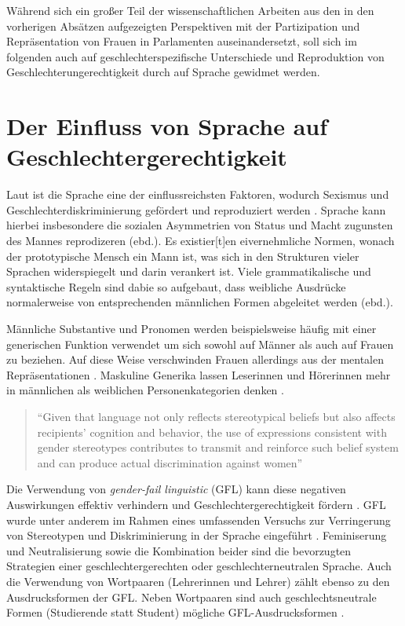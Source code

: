 \documentclass[12pt, 
    twoside=false, 
    bibliography=totoc, 
    numbers=endperiod, 
    headings=normal, 
    toc=chapterentrydotfill
    ]{scrbook}
\begin{document}
Während sich ein großer Teil der wissenschaftlichen Arbeiten aus den in den vorherigen Absätzen aufgezeigten Perspektiven mit der Partizipation und Repräsentation von Frauen in Parlamenten auseinandersetzt, soll sich im folgenden auch auf geschlechterspezifische Unterschiede und Reproduktion von Geschlechterungerechtigkeit durch auf Sprache gewidmet werden.

\chapter{Der Einfluss von Sprache auf Geschlechtergerechtigkeit}

Laut \textcite{menegatti_2017} ist die Sprache eine der einflussreichsten Faktoren, wodurch Sexismus und Geschlechterdiskriminierung gefördert und reproduziert werden \parencite*[1]{menegatti_2017}. Sprache kann hierbei insbesondere die sozialen Asymmetrien von Status und Macht zugunsten des Mannes reprodizeren (ebd.). Es existier[t]en eivernehmliche Normen, wonach der prototypische Mensch ein Mann ist, was sich in den Strukturen vieler Sprachen widerspiegelt und darin verankert ist. Viele grammatikalische und syntaktische Regeln sind dabie so aufgebaut, dass weibliche Ausdrücke normalerweise von entsprechenden männlichen Formen abgeleitet werden (ebd.).


Männliche Substantive und Pronomen werden beispielsweise häufig mit einer generischen Funktion verwendet um sich sowohl auf Männer als auch auf Frauen zu beziehen. Auf diese Weise verschwinden Frauen allerdings aus der mentalen Repräsentationen \parencites{vaughan_2018}{stahlberg_2001}. Maskuline Generika lassen Leser\*innen und Hörer\*innen mehr in männlichen als weiblichen Personenkategorien denken \parencites[2]{sczesny_2016}{stahlberg_2007}.

\begin{quote}
    \enquote{Given that language not only reflects stereotypical beliefs but also affects recipients’ cognition and behavior, the use of expressions consistent with gender stereotypes contributes to transmit and reinforce such belief system and can produce actual discrimination against women} \parencite[2]{menegatti_2017}
\end{quote}

Die Verwendung von \emph{gender-fail linguistic} (GFL) kann diese negativen Auswirkungen effektiv verhindern und Geschlechtergerechtigkeit fördern \parencite[1]{menegatti_2017}. GFL wurde unter anderem im Rahmen eines umfassenden Versuchs zur Verringerung von Stereotypen und Diskriminierung in der Sprache eingeführt \parencite[2]{sczesny_2016}. Feminiserung und Neutralisierung sowie die Kombination beider sind die bevorzugten Strategien einer geschlechtergerechten oder geschlechterneutralen Sprache. Auch die Verwendung von Wortpaaren (Lehrerinnen und Lehrer) zählt ebenso zu den Ausdrucksformen der GFL. Neben Wortpaaren sind auch geschlechtsneutrale Formen (Studierende statt Student) mögliche GFL-Ausdrucksformen \parencite[2]{sczesny_2016}.
\end{document}
